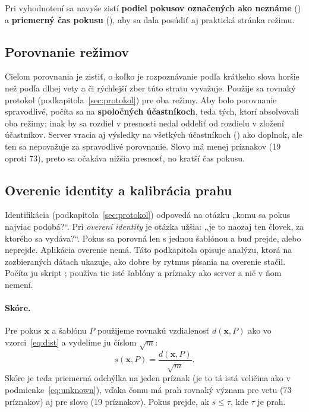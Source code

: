 Pri vyhodnotení sa navyše zistí \textbf{podiel pokusov označených ako neznáme}
() a \textbf{priemerný čas pokusu} (),
aby sa dala posúdiť aj praktická stránka režimu.

\subsection{Porovnanie režimov}
\label{sec:porovnanie}

Cieľom porovnania je zistiť, o koľko je rozpoznávanie podľa krátkeho slova
horšie než podľa dlhej vety a či rýchlejší zber túto stratu vyvažuje.
Použije sa rovnaký protokol (podkapitola~\ref{sec:protokol}) pre oba režimy.
Aby bolo porovnanie spravodlivé, počíta sa na \textbf{spoločných účastníkoch},
teda tých, ktorí absolvovali oba režimy; inak by sa rozdiel v presnosti nedal
oddeliť od rozdielu v zložení účastníkov. Server vracia aj výsledky na
všetkých účastníkoch () ako doplnok, ale ten sa nepovažuje za
spravodlivé porovnanie. Slovo má menej príznakov (19 oproti 73), preto sa
očakáva nižšia presnosť, no kratší čas pokusu.

\subsection{Overenie identity a kalibrácia prahu}
\label{sec:overenie}

Identifikácia (podkapitola~\ref{sec:protokol}) odpovedá na otázku „komu sa pokus
najviac podobá?“. Pri \emph{overení identity} je otázka užšia: „je to naozaj ten
človek, za ktorého sa vydáva?“. Pokus sa porovná len s jednou šablónou a buď
prejde, alebo neprejde. Aplikácia overenie nemá. Táto podkapitola opisuje
analýzu, ktorá na zozbieraných dátach ukazuje, ako dobre by rytmus písania na
overenie stačil. Počíta ju skript ; používa tie isté
šablóny a príznaky ako server a nič v ňom nemení.

\paragraph{Skóre.}
Pre pokus $\mathbf{x}$ a šablónu $P$ použijeme rovnakú vzdialenosť
$d(\mathbf{x}, P)$ ako vo vzorci~\eqref{eq:dist} a vydelíme ju číslom $\sqrt{m}$:
\begin{equation}
  \label{eq:score}
  s(\mathbf{x}, P) = \frac{d(\mathbf{x}, P)}{\sqrt{m}}.
\end{equation}
Skóre je teda priemerná odchýlka na jeden príznak (je to tá istá veličina ako
v podmienke~\eqref{eq:unknown}), vďaka čomu má prah rovnaký význam pre vetu
(73 príznakov) aj pre slovo (19 príznakov). Pokus prejde, ak $s \le \tau$, kde
$\tau$ je prah.

